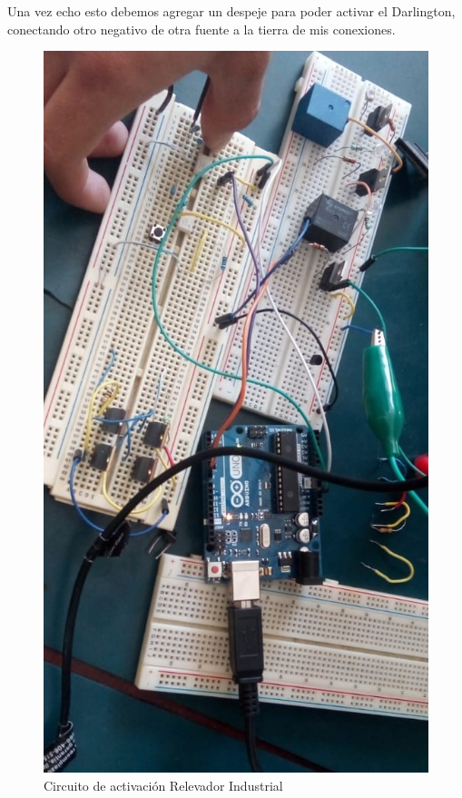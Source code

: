 \documentclass[10pt,a4paper]{article}
\begin{document}
Una vez echo esto debemos agregar un despeje para poder activar el Darlington, conectando otro negativo de otra fuente a la tierra de mis conexiones.\\
\begin{figure}[hbtp]
\centering
\includegraphics[scale=0.3]{Pictures/Relevador.jpeg}
\caption{Circuito de activación Relevador Industrial}
\end{figure}
\end{document}
